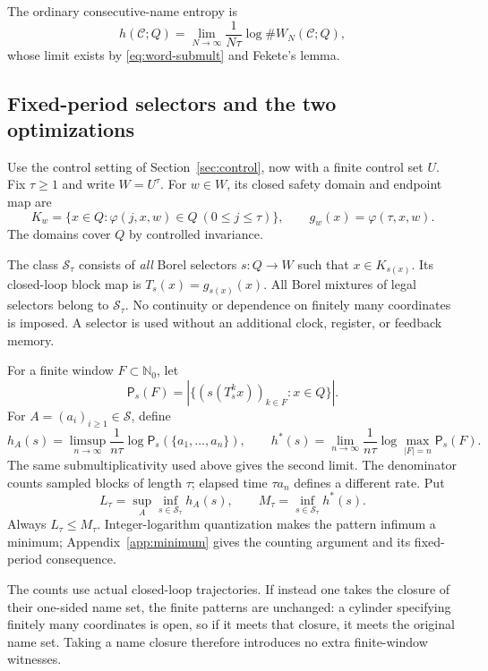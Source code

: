 \documentclass[11pt,reqno]{amsart}
\numberwithin{equation}{section}
\theoremstyle{definition}
\newcommand{\Nzero}{\mathbb N_0}
\newcommand{\C}{\mathcal C}
\newcommand{\Patt}{\mathsf P}
\newcommand{\hpat}{h^{*}}
\newcommand{\Ssafe}{\mathcal S}
\begin{document}
The ordinary consecutive-name entropy is
\begin{equation}\label{eq:ordinary-partition-entropy}
 h(\C;Q)=\lim_{N\to\infty}\frac1{N\tau}\log\#W_N(\C;Q),
\end{equation}
whose limit exists by \eqref{eq:word-submult} and Fekete's lemma.


\subsection{Fixed-period selectors and the two optimizations}\label{sec:selectors}

Use the control setting of Section~\ref{sec:control}, now with a
finite control set $U$. Fix $\tau\ge1$ and write $W=U^\tau$.
For $w\in W$, its closed safety domain and endpoint map are
\begin{equation}\label{cc-eq:safe}
 K_w=\{x\in Q:\varphi(j,x,w)\in Q\ (0\le j\le\tau)\},
 \qquad g_w(x)=\varphi(\tau,x,w).
\end{equation}
The domains cover $Q$ by controlled invariance.

The class $\Ssafe_\tau$ consists of \emph{all} Borel selectors $s:Q\to W$
such that $x\in K_{s(x)}$. Its closed-loop block map is
$T_s(x)=g_{s(x)}(x)$. All Borel mixtures of legal selectors belong to
$\Ssafe_\tau$. No continuity or dependence on finitely many coordinates
is imposed. A selector is used without an additional clock, register,
or feedback memory.

For a finite window $F\subset\Nzero$, let
\[
 \Patt_s(F)=\left|\{(s(T_s^k x))_{k\in F}:x\in Q\}\right|.
\]
For $A=(a_i)_{i\ge1}\in\mathscr S$, define
\[
 h_A(s)=\limsup_{n\to\infty}\frac{1}{n\tau}
       \log\Patt_s(\{a_1,\ldots,a_n\}),\qquad
 h^*(s)=\lim_{n\to\infty}\frac{1}{n\tau}
       \log\max_{|F|=n}\Patt_s(F).
\]
The same submultiplicativity used above gives the second limit.
The denominator counts sampled blocks of length $\tau$; elapsed
time $\tau a_n$ defines a different rate.
Put
\begin{equation}\label{cc-eq:LM}
 L_\tau=\sup_A\inf_{s\in\Ssafe_\tau}h_A(s),\qquad
 M_\tau=\inf_{s\in\Ssafe_\tau}\hpat(s).
\end{equation}
Always $L_\tau\le M_\tau$. Integer-logarithm quantization makes
the pattern infimum a minimum; Appendix~\ref{app:minimum} gives
the counting argument and its fixed-period consequence.

The counts use actual closed-loop trajectories. If instead one takes
the closure of their one-sided name set, the finite patterns are
unchanged: a cylinder specifying finitely many coordinates is open, so
if it meets that closure, it meets the original name set. Taking a name
closure therefore introduces no extra finite-window witnesses.
\end{document}
